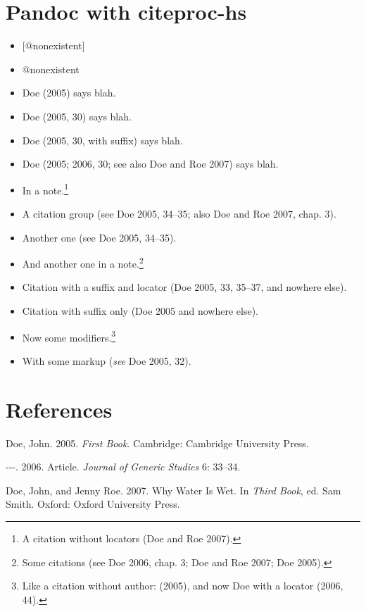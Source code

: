 \documentclass[]{article}
\author{}
\date{}
\begin{document}
\section{Pandoc with citeproc-hs}

\begin{itemize}
\item
  {[}@nonexistent{]}
\item
  @nonexistent
\item
  Doe (2005) says blah.
\item
  Doe (2005, 30) says blah.
\item
  Doe (2005, 30, with suffix) says blah.
\item
  Doe (2005; 2006, 30; see also Doe and Roe 2007) says blah.
\item
  In a note.\footnote{A citation without locators (Doe and Roe 2007).}
\item
  A citation group (see Doe 2005, 34--35; also Doe and Roe 2007, chap.
  3).
\item
  Another one (see Doe 2005, 34--35).
\item
  And another one in a note.\footnote{Some citations (see Doe 2006,
    chap. 3; Doe and Roe 2007; Doe 2005).}
\item
  Citation with a suffix and locator (Doe 2005, 33, 35--37, and nowhere
  else).
\item
  Citation with suffix only (Doe 2005 and nowhere else).
\item
  Now some modifiers.\footnote{Like a citation without author: (2005),
    and now Doe with a locator (2006, 44).}
\item
  With some markup (\emph{see} Doe 2005, 32).
\end{itemize}

\section{References}

Doe, John. 2005. \emph{First Book}. Cambridge: Cambridge University
Press.

-{}-{}-. 2006. Article. \emph{Journal of Generic Studies} 6: 33--34.

Doe, John, and Jenny Roe. 2007. Why Water Is Wet. In \emph{Third Book},
ed. Sam Smith. Oxford: Oxford University Press.
\end{document}
